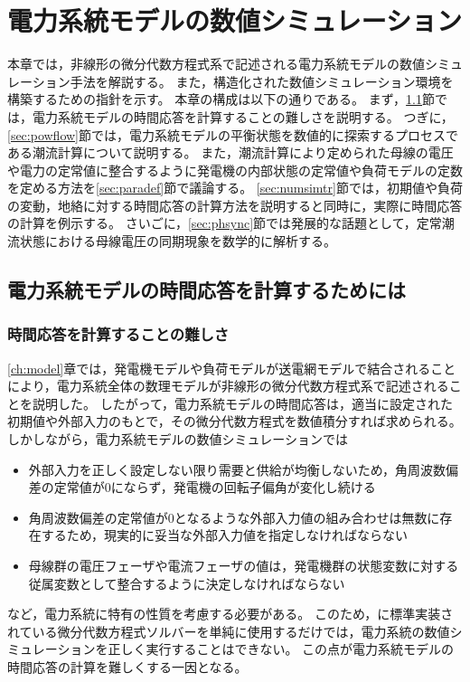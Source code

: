 \documentclass[tombow,dvipdfmx]{corona-a5-1.1}
\begin{document}
\chapter{電力系統モデルの数値シミュレーション}\label{chap:numcal}

本章では，非線形の微分代数方程式系で記述される電力系統モデルの数値シミュレーション手法を解説する。
また，構造化された数値シミュレーション環境を構築するための指針を示す。
本章の構成は以下の通りである。
まず，\ref{sec:howtocal}節では，電力系統モデルの時間応答を計算することの難しさを説明する。
つぎに，\ref{sec:powflow}節では，電力系統モデルの平衡状態を数値的に探索するプロセスである潮流計算について説明する。
また，潮流計算により定められた母線の電圧や電力の定常値に整合するように発電機の内部状態の定常値や負荷モデルの定数を定める方法を\ref{sec:paradef}節で議論する。
\ref{sec:numsimtr}節では，初期値や負荷の変動，地絡に対する時間応答の計算方法を説明すると同時に，実際に時間応答の計算を例示する。
さいごに，\ref{sec:phsync}節では発展的な話題として，定常潮流状態における母線電圧の同期現象を数学的に解析する。

\section{電力系統モデルの時間応答を計算するためには}\label{sec:howtocal}

\subsection{時間応答を計算することの難しさ}

\ref{ch:model}章では，発電機モデルや負荷モデルが送電網モデルで結合されることにより，電力系統全体の数理モデルが非線形の微分代数方程式系で記述されることを説明した。
したがって，電力系統モデルの時間応答は，適当に設定された初期値や外部入力のもとで，その微分代数方程式を数値積分すれば求められる。
しかしながら，電力系統モデルの数値シミュレーションでは
\begin{itemize}
\item 外部入力を正しく設定しない限り需要と供給が均衡しないため，角周波数偏差の定常値が0にならず，発電機の回転子偏角が変化し続ける
\item 角周波数偏差の定常値が0となるような外部入力値の組み合わせは無数に存在するため，現実的に妥当な外部入力値を指定しなければならない
\item 母線群の電圧フェーザや電流フェーザの値は，発電機群の状態変数に対する従属変数として整合するように決定しなければならない
\end{itemize}
など，電力系統に特有の性質を考慮する必要がある。
このため，\matlab に標準実装されている微分代数方程式ソルバーを単純に使用するだけでは，電力系統の数値シミュレーションを正しく実行することはできない。
この点が電力系統モデルの時間応答の計算を難しくする一因となる。
\end{document}
